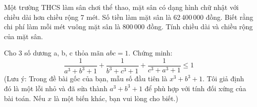 \begin{ex}
{\begin{center}
				
	\end{center}
	
	}
\end{ex}

\begin{ex}
	Một trường THCS làm sân chơi thể thao, mặt sân có dạng hình chữ nhật với chiều dài hơn chiều rộng 7 mét. Số tiền làm mặt sân là 62\,400\,000 đồng. Biết rằng chi phí làm mỗi mét vuông mặt sân là 800\,000 đồng. Tính chiều dài và chiều rộng của mặt sân.
\end{ex}

\begin{ex}
	Cho 3 số dương a, b, c thỏa mãn $abc = 1$. Chứng minh:
	$$ \frac{1}{a^3 + b^3 + 1} + \frac{1}{b^3 + c^3 + 1} + \frac{1}{c^3 + a^3 + 1} \le 1 $$
	(Lưu ý: Trong đề bài gốc của bạn, mẫu số đầu tiên là $x^3 + b^3 + 1$. Tôi giả định đó là một lỗi nhỏ và đã sửa thành $a^3 + b^3 + 1$ để phù hợp với tính đối xứng của bài toán. Nếu $x$ là một biến khác, bạn vui lòng cho biết.)
\end{ex}


